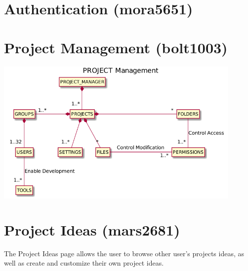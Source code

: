 \documentclass[11pt]{report}
\begin{document}
\section{Authentication (mora5651)}



\section{Project Management (bolt1003)}
    \begin{minipage}{0.9\textwidth}
        \begin{center}
        \includegraphics[width=0.9\textwidth]{diagrams/project-management-bolt1003}
        \end{center}
    \end{minipage}


\section{Project Ideas (mars2681)}
    The Project Ideas page allows the user to browse other user's projects ideas, as well as create and customize their own project ideas.
\end{document}
